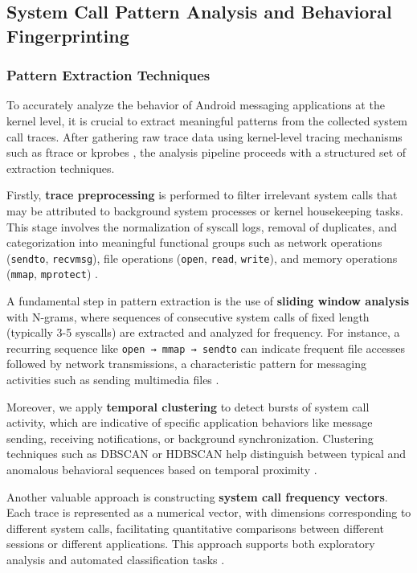 \documentclass[a4paper,12pt]{report}
\begin{document}
\subsection{System Call Pattern Analysis and Behavioral Fingerprinting}

\subsubsection{Pattern Extraction Techniques}
To accurately analyze the behavior of Android messaging applications at the kernel level, it is crucial to extract meaningful patterns from the collected system call traces. After gathering raw trace data using kernel-level tracing mechanisms such as ftrace or kprobes \cite{gregg2019bpf}, the analysis pipeline proceeds with a structured set of extraction techniques.

Firstly, \textbf{trace preprocessing} is performed to filter irrelevant system calls that may be attributed to background system processes or kernel housekeeping tasks. This stage involves the normalization of syscall logs, removal of duplicates, and categorization into meaningful functional groups such as network operations (\texttt{sendto}, \texttt{recvmsg}), file operations (\texttt{open}, \texttt{read}, \texttt{write}), and memory operations (\texttt{mmap}, \texttt{mprotect}) \cite{tanenbaum2015modern}.

A fundamental step in pattern extraction is the use of \textbf{sliding window analysis} with N-grams, where sequences of consecutive system calls of fixed length (typically 3-5 syscalls) are extracted and analyzed for frequency. For instance, a recurring sequence like \texttt{open → mmap → sendto} can indicate frequent file accesses followed by network transmissions, a characteristic pattern for messaging activities such as sending multimedia files \cite{kim2019syscall}.

Moreover, we apply \textbf{temporal clustering} to detect bursts of system call activity, which are indicative of specific application behaviors like message sending, receiving notifications, or background synchronization. Clustering techniques such as DBSCAN or HDBSCAN help distinguish between typical and anomalous behavioral sequences based on temporal proximity \cite{ester1996density}.

Another valuable approach is constructing \textbf{system call frequency vectors}. Each trace is represented as a numerical vector, with dimensions corresponding to different system calls, facilitating quantitative comparisons between different sessions or different applications. This approach supports both exploratory analysis and automated classification tasks \cite{bishop2007pattern}.
\end{document}
